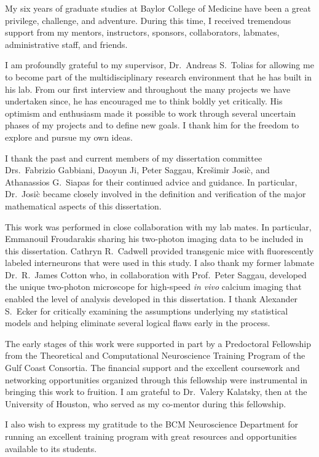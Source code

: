 My six years of graduate studies at Baylor College of Medicine have been a great privilege, challenge, and adventure. During this time, I received tremendous support from my mentors, instructors, sponsors, collaborators, labmates, administrative staff, and friends.

I am profoundly grateful to my supervisor, Dr.\ Andreas S.\ Tolias for allowing me to become part of the multidisciplinary research environment that he has built in his lab. From our first interview and throughout the many projects we have undertaken since, he has encouraged me to think boldly yet critically.  His optimism and enthusiasm made it possible to work through several uncertain phases of my projects and to define new goals.  I thank him for the freedom to explore and pursue my own ideas.

I thank the past and current members of my dissertation committee Drs.\ Fabrizio Gabbiani, Daoyun Ji, Peter Saggau, Kre\v{s}imir Josi\`c, and Athanassios G.\ Siapas  for their continued advice and guidance. In particular, Dr.\ Josi\`c became closely involved in the definition and verification of the major mathematical aspects of this dissertation.

This work was performed in close collaboration with my lab mates. In particular, Emmanouil Froudarakis sharing his two-photon imaging data to be included in this dissertation. Cathryn R.\ Cadwell provided transgenic mice with fluorescently labeled interneurons that were used in this study. I also thank my former labmate Dr.\ R.\ James Cotton who, in collaboration with Prof.~Peter Saggau, developed the unique two-photon microscope for high-speed \emph{in vivo} calcium imaging that enabled the level of analysis developed in this dissertation. I thank Alexander S.\ Ecker for critically examining the assumptions underlying my statistical models and helping eliminate several logical flaws early in the process.

The early stages of this  work were supported in part by a Predoctoral Fellowship from the Theoretical and Computational Neuroscience Training Program of the Gulf Coast Consortia.  The financial support and the excellent coursework and networking opportunities organized through this fellowship were instrumental in bringing this work to fruition. I am grateful to Dr.\ Valery Kalatsky, then at the University of Houston, who served as my co-mentor during this fellowship.

I also wish to express my gratitude to the BCM Neuroscience Department for running an excellent training program with great resources and opportunities available to its students.

